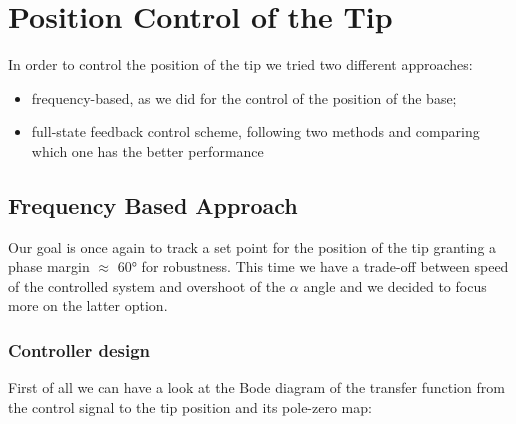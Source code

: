 \chapter{Position Control of the Tip}
\label{cha:position_tip}

In order to control the position of the tip we tried two different approaches:
\begin{itemize}
    \item frequency-based, as we did for the control of the position of the base;
    \item full-state feedback control scheme, following two methods and comparing which one has the better performance
\end{itemize} 

\section{Frequency Based Approach}

Our goal is once again to track a set point for the position of the tip granting a phase margin $\approx$ 60° for robustness. This time we have a trade-off between speed of the controlled system and overshoot of the $\alpha$ angle and we decided to focus more on the latter option.

\subsection{Controller design}

First of all we can have a look at the Bode diagram of the transfer function from the control signal to the tip position and its pole-zero map:

